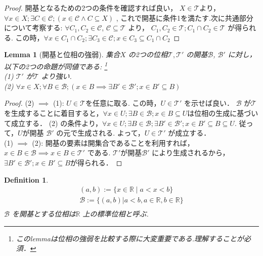 \documentclass[dvipdfmx]{jbook}
\newtheorem{lemma}[theorem]{Lemma}
\newtheorem{definition}{Definition}[section]
\theoremstyle{remark}
\theoremstyle{plain}
\begin{document}
\begin{proof}
	開基となるための2つの条件を確認すれば良い，
	$X \in \mathcal{T}$より，
	$\forall x \in X; \exists C \in \mathcal{C}; \left( x \in \mathcal{C} \land C \subseteq X  \right)  $ ,
	これで開基に条件1を満たす.次に共通部分について考察する: 
	$\forall C_1 , C_2  \in \mathcal{C} $,
	$ \mathcal{C} \subseteq \mathcal{T}$ より，
	$C_1 , C_2 \in \mathcal{T}; C_1 \cap C_2 \in \mathcal{T}$ が得られる.
	この時，$\forall x \in C_1 \cap C_2; \exists C_3 \in \mathcal{C} ; x \in C_3 \subseteq C_1 \cap C_2$
\end{proof}






\begin{lemma}[開基と位相の強弱]
	集合$X$ の2つの位相$\mathcal{T} , \mathcal{T'}$ の開基$ \mathcal{B}$, $ \mathcal{B'}$ に対し，
	以下の2つの命題が同値である: \footnote{このlemmaは位相の強弱を比較する際に大変重要である.理解することが必須．}\\
	(1) $\mathcal{T'}$ が$\mathcal{T}$ より強い.\\
	(2) $\forall x \in X; \forall B \in \mathcal{B} ; \left( x \in B \implies  \exists B' \in  \mathcal{B'} ; x \in B' \subseteq B \right) $
\end{lemma}

\begin{proof}
	(2) $ \implies $ (1): $U \in \mathcal{T} $を任意に取る.
	この時，$U \in \mathcal{T'}$ を示せば良い．
	$\mathcal{B}  $ が$\mathcal{T}$ を生成することに着目すると，$\forall x \in U; \exists B \in \mathcal{B}; x \in B \subseteq U$は位相の生成に基づいて成立する．
	(2) の条件より，$\forall x \in U; \exists B \in \mathcal{B};\exists B' \in \mathcal{B'}; x \in B' \subseteq B \subseteq U$. 
	従って，$U$が開基 $\mathcal{B'}$ の元で生成される. 
	よって，$U \in \mathcal{T'}$ が成立する．\\
	(1) $\implies $ (2): 開基の要素は開集合であることを利用すれば，
	$x \in B \in \mathcal{B} \implies x \in B \in \mathcal{T'}$ である.
	$\mathcal{T'}$が開基$\mathcal{B'}$ により生成されるから，
	$\exists B' \in \mathcal{B'} ; x \in B' \subseteq B$が得られる．

\end{proof}




\begin{definition}
	$$
	\begin{array}{c}
	(a,b):= \{ x \in \mathbb{R}  \mid a <x<b  \}\\
	\mathcal{B}:= \{ \left( a ,b \right) |a<b, a \in \mathbb{R} , b \in \mathbb{R} \} \\
	\end{array}
	$$
	$\mathcal{B}$ を開基とする位相は$\mathbb{R}$ 上の標準位相と呼ぶ.
\end{definition}
\end{document}
